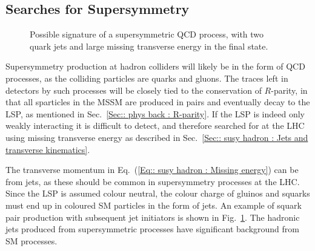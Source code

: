 \documentclass[twoside,english]{uiofysmaster}
\begin{document}
{\subsection{Searches for Supersymmetry}

\begin{figure}[H]
\centering
{}
\caption[Possible supersymmetric QCD signature at the LHC]{Possible signature of a supersymmetric QCD process, with two quark jets and large missing transverse energy in the final state.}
\label{Fig:: susy hadron : decay at ATLAS}
\end{figure}


Supersymmetry production at hadron colliders will likely be in the form of QCD processes, as the colliding particles are quarks and gluons. The traces left in detectors by such processes will be closely tied to the conservation of $R$-parity, in that all sparticles in the MSSM are produced in pairs and eventually decay to the LSP, as mentioned in Sec.~\ref{Sec:: phys back : R-parity}. If the LSP is indeed only weakly interacting it is difficult to detect, and therefore searched for at the LHC using missing transverse energy as described in Sec.~\ref{Sec:: susy hadron : Jets and transverse kinematics}. 

The transverse momentum in Eq.~(\ref{Eq:: susy hadron : Missing energy}) can be from jets, as these should be common in supersymmetry processes at the LHC. Since the LSP is assumed colour neutral, the colour charge of gluinos and squarks must end up in coloured SM particles in the form of jets. An example of squark pair production with subsequent jet initiators is shown in Fig.~\ref{Fig:: susy hadron : decay at ATLAS}. The hadronic jets produced from supersymmetric processes have significant background from SM processes. 

}
\end{document}
